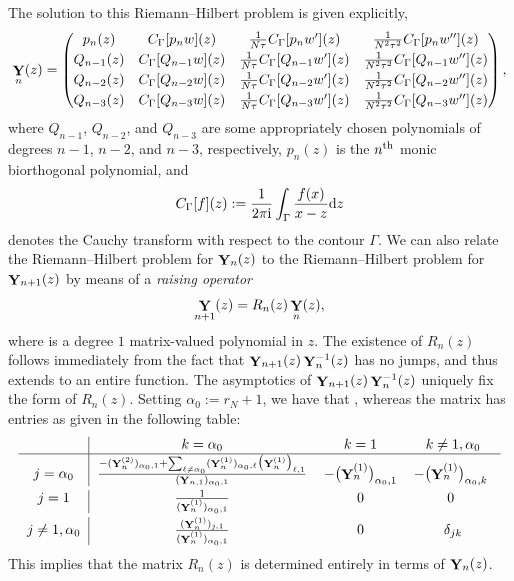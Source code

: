 \documentclass[pdftex]{sigma}
\DeclareMathOperator{\YY}{{\bf Y}}
\numberwithin{equation}{section}
\begin{document}
The solution to this Riemann--Hilbert problem is given explicitly,
 \begin{equation*}
 \YY_n(z) =
 \begin{pmatrix}
 p_n(z) & C_\Gamma[p_n w](z) & \frac{1}{N\tau} C_\Gamma[p_n w'](z) & \frac{1}{N^2\tau^2} C_\Gamma[p_n w''](z)\\[0.9mm]
 Q_{n-1}(z) & C_\Gamma[Q_{n-1} w](z) & \frac{1}{N\tau} C_\Gamma[Q_{n-1} w'](z) & \frac{1}{N^2\tau^2} C_\Gamma[Q_{n-1} w''](z)\\[0.9mm]
 Q_{n-2}(z) & C_\Gamma[Q_{n-2} w](z) & \frac{1}{N\tau} C_\Gamma[Q_{n-2} w'](z) & \frac{1}{N^2\tau^2} C_\Gamma[Q_{n-2} w''](z)\\[0.9mm]
 Q_{n-3}(z) & C_\Gamma[Q_{n-3} w](z) & \frac{1}{N\tau} C_\Gamma[Q_{n-3} w'](z) & \frac{1}{N^2\tau^2} C_\Gamma[Q_{n-3} w''](z)
 \end{pmatrix},
 \end{equation*}
where $Q_{n-1}$, $Q_{n-2}$, and $Q_{n-3}$ are some appropriately chosen polynomials of degrees $n-1$, $n-2$, and $n-3$, respectively, $p_n(z)$ is the
$n^{\rm th}$ monic biorthogonal polynomial, and
 \begin{equation*}
 C_{\Gamma}[f](z) := \frac{1}{2\pi {\rm i}} \int_{\Gamma} \frac{f(x)}{x-z} {\rm d}z
 \end{equation*}
denotes the Cauchy transform with respect to the contour $\Gamma$. We can also relate the Riemann--Hilbert problem for $\YY_n(z)$ to the Riemann--Hilbert
problem for $\YY_{n+1}(z)$ by means of a \textit{raising operator}
 \begin{equation*}
 \YY_{n+1}(z) = R_n(z) \YY_n(z),
 \end{equation*}
where  is a degree $1$ matrix-valued polynomial in $z$. The existence of $R_n(z)$ follows immediately from the fact that
$\YY_{n+1}(z)\YY_n^{-1}(z)$ has no jumps, and thus extends to an entire function. The asymptotics of $\YY_{n+1}(z)\YY_n^{-1}(z)$ uniquely fix the form of
$R_n(z)$. Setting $\alpha_0 := r_N + 1$, we have that , whereas the matrix  has entries as given in the following table:
 \begin{equation*}%
 \begin{tabular}{c| c c c }
 & $k=\alpha_0$ & $k = 1$ & $k\neq 1, \alpha_0$\\
 \hline
 $j=\alpha_0$ & $\frac{-(\YY_{n}^{(2)})_{\alpha_0,1} +\sum_{\ell\neq \alpha_0} (\YY_{n}^{(1)})_{\alpha_0,\ell} \bigl(\YY_{n}^{(1)}\bigr)_{\ell,1}}{(\YY_{n,1})_{\alpha_0,1}}$ & $-\bigl(\YY_{n}^{(1)}\bigr)_{\alpha_0,1}$ & $-\bigl(\YY_{n}^{(1)}\bigr)_{\alpha_0,k}$ \vspace{1mm}\\
 $j=1$ & $\frac{1}{(\YY_{n}^{(1)})_{\alpha_0,1}}$ & $0$ & $0$ \vspace{1mm}\\
 $j\neq 1, \alpha_0$ & $\frac{(\YY_{n}^{(1)})_{j,1}}{(\YY_{n}^{(1)})_{\alpha_0,1}}$ & $0$ & $\delta_{jk}$ \\
 \end{tabular}
 \end{equation*}
This implies that the matrix $R_n(z)$ is determined entirely in terms of $\YY_n(z)$.
\end{document}

